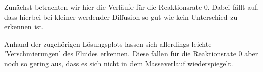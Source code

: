 Zunächst betrachten wir hier die Verläufe für die Reaktionsrate $0$. Dabei fällt auf, dass hierbei bei kleiner werdender Diffusion so gut wie kein Unterschied zu erkennen ist. 

\begin{figure}[H]
	\centering
\end{figure}

Anhand der zugehörigen Lösungsplots lassen sich allerdings leichte 'Verschmierungen' des Fluides erkennen. Diese fallen für die Reaktionsrate $0$ aber noch so gering aus, dass es sich nicht in dem Masseverlauf wiederspiegelt.

